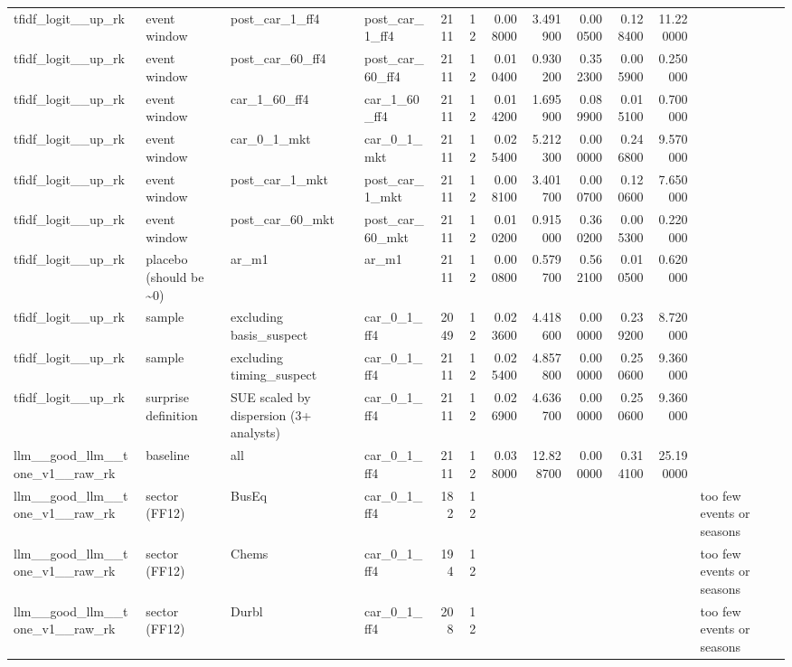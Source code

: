 \begin{table}
\begin{tabular}{llllrrrrrrrl}
tfidf\_logit\_\_up\_rk & event window & post\_car\_1\_ff4 & post\_car\_1\_ff4 & 2111 & 12 & 0.008000 & 3.491900 & 0.000500 & 0.128400 & 11.220000 &  \\
tfidf\_logit\_\_up\_rk & event window & post\_car\_60\_ff4 & post\_car\_60\_ff4 & 2111 & 12 & 0.010400 & 0.930200 & 0.352300 & 0.005900 & 0.250000 &  \\
tfidf\_logit\_\_up\_rk & event window & car\_1\_60\_ff4 & car\_1\_60\_ff4 & 2111 & 12 & 0.014200 & 1.695900 & 0.089900 & 0.015100 & 0.700000 &  \\
tfidf\_logit\_\_up\_rk & event window & car\_0\_1\_mkt & car\_0\_1\_mkt & 2111 & 12 & 0.025400 & 5.212300 & 0.000000 & 0.246800 & 9.570000 &  \\
tfidf\_logit\_\_up\_rk & event window & post\_car\_1\_mkt & post\_car\_1\_mkt & 2111 & 12 & 0.008100 & 3.401700 & 0.000700 & 0.120600 & 7.650000 &  \\
tfidf\_logit\_\_up\_rk & event window & post\_car\_60\_mkt & post\_car\_60\_mkt & 2111 & 12 & 0.010200 & 0.915000 & 0.360200 & 0.005300 & 0.220000 &  \\
tfidf\_logit\_\_up\_rk & placebo (should be \textasciitilde 0) & ar\_m1 & ar\_m1 & 2111 & 12 & 0.000800 & 0.579700 & 0.562100 & 0.010500 & 0.620000 &  \\
tfidf\_logit\_\_up\_rk & sample & excluding basis\_suspect & car\_0\_1\_ff4 & 2049 & 12 & 0.023600 & 4.418600 & 0.000000 & 0.239200 & 8.720000 &  \\
tfidf\_logit\_\_up\_rk & sample & excluding timing\_suspect & car\_0\_1\_ff4 & 2111 & 12 & 0.025400 & 4.857800 & 0.000000 & 0.250600 & 9.360000 &  \\
tfidf\_logit\_\_up\_rk & surprise definition & SUE scaled by dispersion (3+ analysts) & car\_0\_1\_ff4 & 2111 & 12 & 0.026900 & 4.636700 & 0.000000 & 0.250600 & 9.360000 &  \\
llm\_\_good\_llm\_\_tone\_v1\_\_raw\_rk & baseline & all & car\_0\_1\_ff4 & 2111 & 12 & 0.038000 & 12.828700 & 0.000000 & 0.314100 & 25.190000 &  \\
llm\_\_good\_llm\_\_tone\_v1\_\_raw\_rk & sector (FF12) & BusEq & car\_0\_1\_ff4 & 182 & 12 &  &  &  &  &  & too few events or seasons \\
llm\_\_good\_llm\_\_tone\_v1\_\_raw\_rk & sector (FF12) & Chems & car\_0\_1\_ff4 & 194 & 12 &  &  &  &  &  & too few events or seasons \\
llm\_\_good\_llm\_\_tone\_v1\_\_raw\_rk & sector (FF12) & Durbl & car\_0\_1\_ff4 & 208 & 12 &  &  &  &  &  & too few events or seasons \\

\end{tabular}
\end{table}
